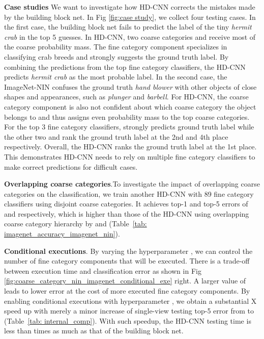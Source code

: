 \documentclass[10pt,twocolumn,letterpaper]{article}
\begin{document}
\noindent \textbf{Case studies} We want to investigate how HD-CNN corrects the mistakes made by the building block net. In Fig \ref{fig:case study}, we collect four testing cases. In the first case, the building block net fails to predict the label of the tiny \textit{hermit crab} in the top 5 guesses. In HD-CNN, two coarse categories  and  receive most of the coarse probability mass. The fine category component  specializes in classifying crab breeds and strongly suggests the ground truth label. By combining the predictions from the top fine category classifiers, the HD-CNN predicts \textit{hermit crab} as the most probable label. In the second case, the ImageNet-NIN confuses the ground truth \textit{hand blower} with other objects of close shapes and appearances, such as \textit{plunger} and \textit{barbell}. For HD-CNN, the coarse category component is also not confident about which coarse category the object belongs to and thus assigns even probability mass to the top coarse categories. For the top 3 fine category classifiers,  strongly predicts ground truth label while the other two  and  rank the ground truth label at the 2nd and 4th place respectively. Overall, the HD-CNN ranks the ground truth label at the 1st place. This demonstrates HD-CNN needs to rely on multiple fine category classifiers to make correct predictions for difficult cases.






\noindent \textbf{Overlapping coarse categories}.To investigate the impact of overlapping coarse categories on the classification, we train another HD-CNN with 89 fine category classifiers using disjoint coarse categories. It achieves top-1 and top-5 errors of  and  respectively, which is higher than those of the HD-CNN using overlapping coarse category hierarchy by  and  (Table~\ref{tab: imagenet_accuracy_imagenet_nin}).

\noindent \textbf{Conditional executions}. By varying the hyperparameter , we can control the number of fine category components that will be executed. There is a trade-off between execution time and classification error as shown in Fig  \ref{fig:coarse_category_nin_imagenet_conditional_exe} right. A larger value of  leads to lower error at the cost of more executed fine category components. By enabling conditional executions with hyperparameter , we obtain a substantial X speed up with merely a minor increase of single-view testing top-5 error from  to  (Table~\ref{tab: internal_comp}). With such speedup, the HD-CNN testing time is less than  times as much as that of the building block net.
\end{document}
